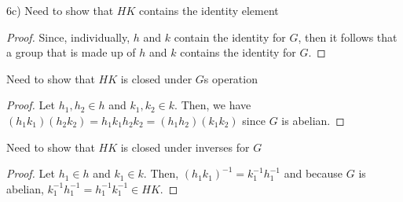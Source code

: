 \documentclass[executivepaper]{article}
\begin{document}
\begin{flushleft}

6c) Need to show that $HK$ contains the identity element

\begin{center}

\begin{proof}

Since, individually, $h$ and $k$ contain the identity for $G$, then it follows that a group that is made up of $h$ and $k$ contains the identity for $G$.

\end{proof}

\end{center}

Need to show that $HK$ is closed under $G$\textsc{}s operation

\begin{center}

\begin{proof}

Let $h_{1}, h_{2} \in h$ and $k_{1}, k_{2} \in k$. Then, we have $(h_{1} k_{1})(h_{2}k_{2})=h_{1}k_{1}h_{2}k_{2}=(h_{1}h_{2})(k_{1}k_{2})$ since $G$ is abelian.

\end{proof}

\end{center}

\pagebreak

\vspace*{-40mm}

Need to show that $HK$ is closed under inverses for $G$

\begin{center}

\begin{proof}

Let $h_{1} \in h$ and $k_{1} \in k$. Then, $(h_{1}k_{1})^{-1}=k_{1}^{-1}h_{1}^{-1}$ and because $G$ is abelian, $k_{1}^{-1}h_{1}^{-1}=h_{1}^{-1}k_{1}^{-1} \in HK$.

\end{proof}

\end{center}

\end{flushleft}
\end{document}

